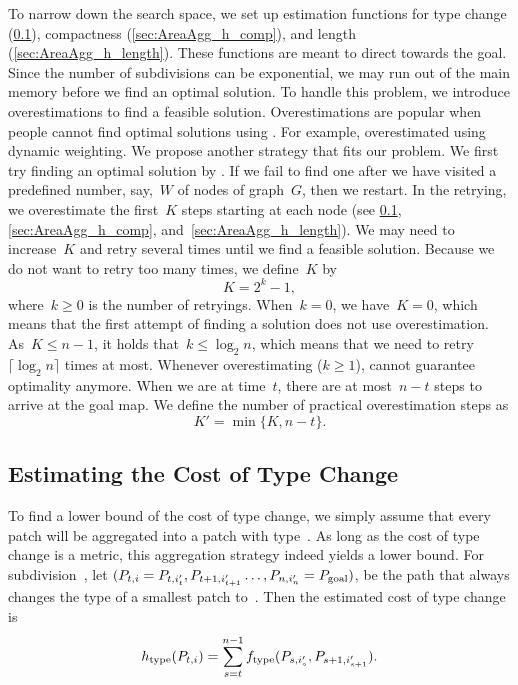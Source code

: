 To narrow down the search space, 
we set up estimation functions 
for type change (\sect\ref{sec:AreaAgg_h_type}), 
compactness (\sect\ref{sec:AreaAgg_h_comp}), 
and length (\sect\ref{sec:AreaAgg_h_length}). 
These functions are meant to direct \Astar towards the goal.
Since the number of subdivisions can be exponential, 
we may run out of the main memory 
before we find an optimal solution. 
To handle this problem, we introduce overestimations 
to find a feasible solution. 
Overestimations are popular 
when people cannot find optimal solutions using \Astar. 
For example, \textcite{Pohl1973} overestimated 
using dynamic weighting. 
We propose another strategy that fits our problem. 
We first try finding an optimal solution by \Astar. 
If we fail to find one after 
we have visited a predefined number, 
say,~$W$ of nodes of graph~$G$,
then we restart.
In the retrying, we overestimate the first~$K$ steps 
starting at each node
(see \sects\ref{sec:AreaAgg_h_type}, \ref{sec:AreaAgg_h_comp},
and~\ref{sec:AreaAgg_h_length}).
We may need to increase~$K$ and retry several times 
until we find a feasible solution.
Because we do not want to retry too many times,
we define~$K$ by
\begin{equation}
\label{eq:OverestimateK}
K= 2^k -1,
\end{equation}
where~$k\ge 0$ is the number of retryings.
When~$k = 0$, we have~$K=0$,
which means that the first attempt of finding a solution
does not use overestimation.
As~$K\le n-1$, it holds that~$k \le \log_2 n$, 
which means that we need to 
retry~$\lceil \log_2 n\rceil$ times at most.
Whenever overestimating ($k\geq1$), 
\Astar cannot guarantee optimality anymore.
When we are at time~$t$, there are at most~$n-t$ steps 
to arrive at the goal map.
We define the number of practical overestimation steps as
\begin{equation}
\label{eq:OverestimateKPrime}
K'= \min \{K, n-t\}.
\end{equation}



\subsection{Estimating the Cost of Type Change}
\label{sec:AreaAgg_h_type}

To find a lower bound of the cost of type change, 
we simply assume that 
every patch will be aggregated into a patch with type~\Tgoal.
As long as the cost of type change is a metric, this aggregation 
strategy indeed yields a lower bound.
%
For subdivision~\Pnode, let
$(P_{t,i}=P_{t,i'_t}, P_{t+1,i'_{t+1}} \dots,P_{n,i'_n}=P_\mathrm{goal})$,
be the path that always changes the type of a smallest patch 
to~\Tgoal.
Then the estimated cost of type change is
\begin{equation}
\label{eq:h_type}
h_\mathrm{type}(P_{t,i})=
\sum_{s=t}^{n-1}f_\mathrm{type}(P_{s,i'_s},P_{s+1,i'_{s+1}}).
\end{equation}

